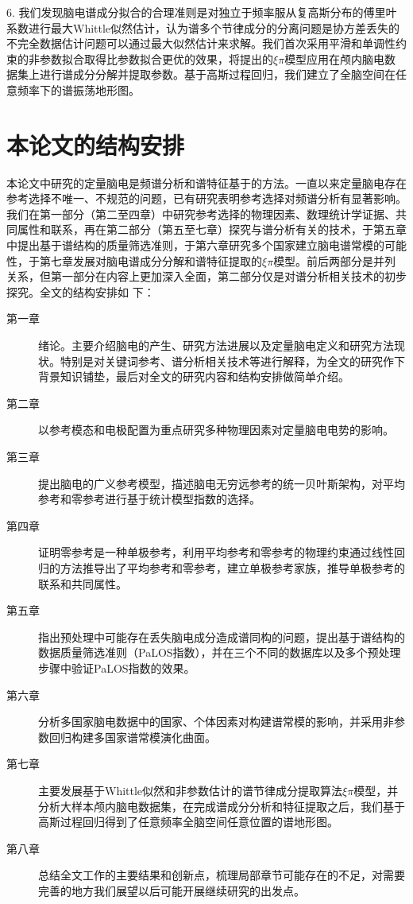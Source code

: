 6. 我们发现脑电谱成分拟合的合理准则是对独立于频率服从复高斯分布的傅里叶系数进行最大Whittle似然估计，认为谱多个节律成分的分离问题是协方差丢失的不完全数据估计问题可以通过最大似然估计来求解。我们首次采用平滑和单调性约束的非参数拟合取得比参数拟合更优的效果，将提出的$\xi\pi$模型应用在颅内脑电数据集上进行谱成分分解并提取参数。基于高斯过程回归，我们建立了全脑空间在任意频率下的谱振荡地形图。

\section{本论文的结构安排}
本论文中研究的定量脑电是频谱分析和谱特征基于的方法。一直以来定量脑电存在参考选择不唯一、不规范的问题，已有研究表明参考选择对频谱分析有显著影响。我们在第一部分（第二至四章）中研究参考选择的物理因素、数理统计学证据、共同属性和联系，再在第二部分（第五至七章）探究与谱分析有关的技术，于第五章中提出基于谱结构的质量筛选准则，于第六章研究多个国家建立脑电谱常模的可能性，于第七章发展对脑电谱成分分解和谱特征提取的$\xi\pi$模型。前后两部分是并列关系，但第一部分在内容上更加深入全面，第二部分仅是对谱分析相关技术的初步探究。全文的结构安排如
下：
\begin{description}
	\item[第一章] 绪论。主要介绍脑电的产生、研究方法进展以及定量脑电定义和研究方法现状。特别是对关键词参考、谱分析相关技术等进行解释，为全文的研究作下背景知识铺垫，最后对全文的研究内容和结构安排做简单介绍。
	\item[第二章] 以参考模态和电极配置为重点研究多种物理因素对定量脑电电势的影响。
	\item[第三章] 提出脑电的广义参考模型，描述脑电无穷远参考的统一贝叶斯架构，对平均参考和零参考进行基于统计模型指数的选择。
	\item[第四章] 证明零参考是一种单极参考，利用平均参考和零参考的物理约束通过线性回归的方法推导出了平均参考和零参考，建立单极参考家族，推导单极参考的联系和共同属性。
	\item[第五章] 指出预处理中可能存在丢失脑电成分造成谱同构的问题，提出基于谱结构的数据质量筛选准则（PaLOS指数），并在三个不同的数据库以及多个预处理步骤中验证PaLOS指数的效果。
    \item[第六章] 分析多国家脑电数据中的国家、个体因素对构建谱常模的影响，并采用非参数回归构建多国家谱常模演化曲面。
	\item[第七章] 主要发展基于Whittle似然和非参数估计的谱节律成分提取算法$\xi\pi$模型，并分析大样本颅内脑电数据集，在完成谱成分分析和特征提取之后，我们基于高斯过程回归得到了任意频率全脑空间任意位置的谱地形图。
	\item[第八章] 总结全文工作的主要结果和创新点，梳理局部章节可能存在的不足，对需要完善的地方我们展望以后可能开展继续研究的出发点。
\end{description}